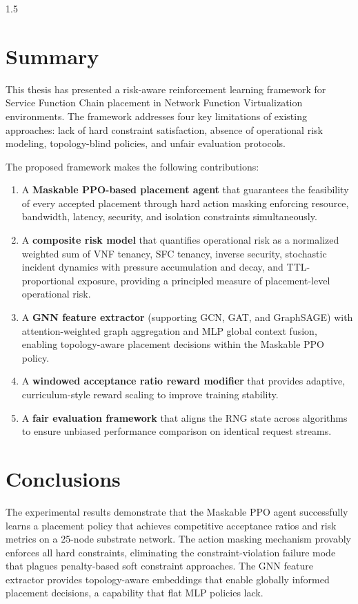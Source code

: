 \documentclass[A4paper,12pt]{report}
\theoremstyle{plain}
\theoremstyle{definition}
\theoremstyle{remark}
\numberwithin{equation}{section}
\begin{document}
\begin{spacing}{1.5}
\section{Summary}

This thesis has presented a risk-aware reinforcement learning framework for Service Function Chain placement in Network Function Virtualization environments. The framework addresses four key limitations of existing approaches: lack of hard constraint satisfaction, absence of operational risk modeling, topology-blind policies, and unfair evaluation protocols.

The proposed framework makes the following contributions:

\begin{enumerate}
  \item A \textbf{Maskable PPO-based placement agent} that guarantees the feasibility of every accepted placement through hard action masking enforcing resource, bandwidth, latency, security, and isolation constraints simultaneously.
  \item A \textbf{composite risk model} that quantifies operational risk as a normalized weighted sum of VNF tenancy, SFC tenancy, inverse security, stochastic incident dynamics with pressure accumulation and decay, and TTL-proportional exposure, providing a principled measure of placement-level operational risk.
  \item A \textbf{GNN feature extractor} (supporting GCN, GAT, and GraphSAGE) with attention-weighted graph aggregation and MLP global context fusion, enabling topology-aware placement decisions within the Maskable PPO policy.
  \item A \textbf{windowed acceptance ratio reward modifier} that provides adaptive, curriculum-style reward scaling to improve training stability.
  \item A \textbf{fair evaluation framework} that aligns the RNG state across algorithms to ensure unbiased performance comparison on identical request streams.
\end{enumerate}

\section{Conclusions}

The experimental results demonstrate that the Maskable PPO agent successfully learns a placement policy that achieves competitive acceptance ratios and risk metrics on a 25-node substrate network. The action masking mechanism provably enforces all hard constraints, eliminating the constraint-violation failure mode that plagues penalty-based soft constraint approaches. The GNN feature extractor provides topology-aware embeddings that enable globally informed placement decisions, a capability that flat MLP policies lack.


\end{spacing}
\end{document}
